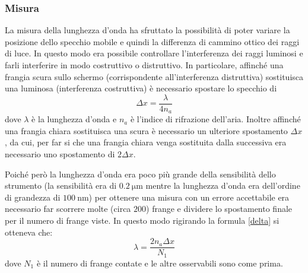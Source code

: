 \documentclass[a4paper,11pt]{article}
\begin{document}
	\subsubsection{Misura}
	La misura della lunghezza d'onda ha sfruttato la possibilità di poter variare la posizione dello specchio mobile e quindi la differenza di cammino ottico dei raggi di luce. In questo modo era possibile controllare l'interferenza dei raggi luminosi e farli interferire in modo costruttivo o distruttivo. In particolare, affinché una frangia scura sullo schermo (corrispondente all'interferenza distruttiva) sostituisca una luminosa (interferenza costruttiva) è necessario spostare lo specchio di 
	\begin{equation}\label{delta}
		\Delta x = \dfrac{\lambda}{4n_a}
	\end{equation}
	dove $ \lambda $ è la lunghezza d'onda e $ n_a $ è l'indice di rifrazione dell'aria. Inoltre affinché una frangia chiara sostituisca una scura è necessario un ulteriore spostamento $ \Delta x $, da cui, per far si che una frangia chiara venga sostituita dalla successiva era necessario uno spostamento di $ 2\Delta x $.
	
	Poiché però la lunghezza d'onda era poco più grande della sensibilità dello strumento (la sensibilità era di $ \SI{0.2}{\micro\meter} $ mentre la lunghezza d'onda era dell'ordine di grandezza di $ \SI{100}{\nano\meter} $) per ottenere una misura con un errore accettabile era necessario far scorrere molte (circa $ \num{200} $) frange e dividere lo spostamento finale per il numero di frange viste. In questo modo rigirando la formula \ref{delta} si otteneva che:
	\begin{equation}\label{lambdana}
		\lambda=\dfrac{2n_a\Delta x}{N_1}		
	\end{equation}
	dove $ N_1 $ è il numero di frange contate e le altre osservabili sono come prima.
	
\end{document}
